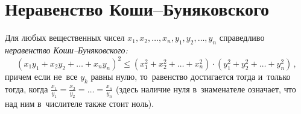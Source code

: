 
\section*{Неравенство Коши--Буняковского}


Для любых вещественных чисел
$x_1, x_2, \ldots, x_n, y_1, y_2, \ldots, y_n$ справедливо
\emph{неравенство Коши--Буняковского:}
\[
    (x_1 y_1 + x_2 y_2 + \ldots + x_n y_n)^2
\leq
    (x_1^2 + x_2^2 + \ldots + x_n^2) \cdot
    (y_1^2 + y_2^2 + \ldots + y_n^2)
\, , \]
причем если не~все $y_k$ равны нулю, то~равенство достигается тогда и~только
тогда, когда
\(
    \frac{x_1}{y_1} = \frac{x_2}{y_2} = \ldots = \frac{x_n}{y_n}
\)
(здесь наличие нуля в~знаменателе означает, что над ним в~числителе также
стоит ноль).

